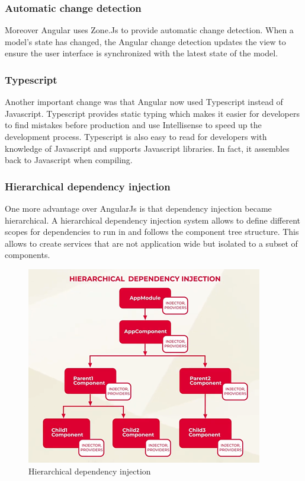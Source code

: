 \subsubsection{Automatic change detection}
Moreover Angular uses Zone.Js to provide automatic change detection. When a model's state has changed, the Angular change detection updates the view to ensure the user interface is synchronized with the latest state of the model.
\autocite{Kumar2020}

\subsubsection{Typescript}
Another important change was that Angular now used Typescript instead of Javascript. Typescript provides static typing which makes it easier for developers to find mistakes before production and use Intellisense to speed up the development process. Typescript is also easy to read for developers with knowledge of Javascript and supports Javascript libraries. In fact, it assembles back to Javascript when compiling.
\autocite{Typescriptlang}

\subsubsection{Hierarchical dependency injection}
One more advantage over AngularJs is that dependency injection became hierarchical. A hierarchical dependency injection system allows to define different scopes for dependencies to run in and follows the component tree structure. This allows to create services that are not application wide but isolated to a subset of components.
\autocite{Rylan}
\begin{figure}[h!]
    \caption{Hierarchical dependency injection}
    \centering
    \includegraphics[width=\textwidth]{img/hieradi.png} 
\end{figure}

